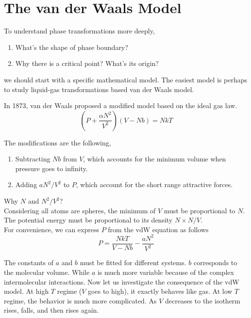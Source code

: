 
\section{The van der Waals Model}
To understand phase transformations more deeply, 
\begin{enumerate}
\item What's the shape of phase boundary?
\item Why there is a critical point? What's its origin?
\end{enumerate}

we should start with a specific mathematical model.
The easiest model is perhaps to study liquid-gas transformations based van der Waals model.

In 1873, van der Waals proposed a modified model based on the ideal gas law.
\begin{equation} 
(P + \frac{\alpha N^2}{V^2})(V-Nb) = NkT
\end{equation}

The modifications are the following,
\begin{enumerate}
\item Subtracting $Nb$ from $V$, which accounts for the minimum volume when pressure goes to infinity. 
\item Adding $aN^2/V^2$ to $P$, which account for the short range attractive forces.
\end{enumerate}

Why $N$ and $N^2/V^2$?\\
Considering all atoms are spheres, the minimum of $V$ must be proportional to $N$.\\
The potential energy must be proportional to its density $N \times N/V$.\\

For convenience, we can express $P$ from the vdW equation as follows
\begin{equation} 
P = \frac{NkT}{V-Nb}-\frac{aN^2}{V^2}
\end{equation}

The constants of $a$ and $b$ must be fitted for different systems.
$b$ corresponds to the molecular volume. While $a$ is much more variable because of the complex intermolecular interactions.
Now let us investigate the consequence of the vdW model.
At high $T$ regime ($V$ goes to high), it exactly behaves like gas.
At low $T$ regime, the behavior is much more complicated. As $V$ decreases to the isotherm rises, falls, and then rises again.

